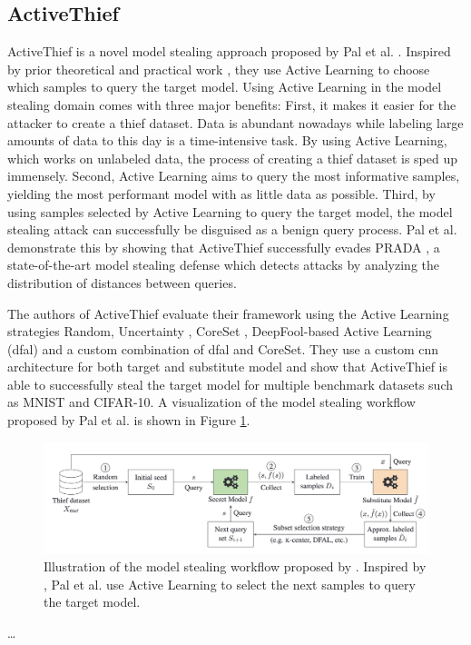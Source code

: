 \subsection{ActiveThief}
\label{sec:Related_work:Model_Stealing:ActiveThief}
ActiveThief is a novel model stealing approach proposed by Pal et al. \cite{pal2020activethief}. Inspired by prior theoretical \cite{chandrasekaran2020exploring}
and practical work \cite{shi2018active}, they use Active Learning to choose which samples to query the target model. Using Active Learning in the model stealing
domain comes with three major benefits: First, it makes it easier for the attacker to create a thief dataset. Data is abundant nowadays while labeling large amounts
of data to this day is a time-intensive task. By using Active Learning, which works on unlabeled data, the process of creating a thief dataset is sped up immensely.
Second, Active Learning aims to query the most informative samples, yielding the most performant model with as little data as possible. Third, by using samples selected
by Active Learning to query the target model, the model stealing attack can successfully be disguised as a benign query process. Pal et al. demonstrate this by showing 
that ActiveThief successfully evades PRADA \cite{juuti2019prada}, a state-of-the-art model stealing defense which detects attacks by analyzing the distribution of distances
between queries. \par
The authors of ActiveThief evaluate their framework using the Active Learning strategies Random, Uncertainty \cite{lewis1995sequential}, CoreSet \cite{sener2017active},
DeepFool-based Active Learning (\gls{dfal}) \cite{ducoffe2018adversarial} and a custom combination of \gls{dfal} and CoreSet. They use a custom \gls{cnn} architecture
for both target and substitute model and show that ActiveThief is able to successfully steal the target model for multiple benchmark datasets such as MNIST and CIFAR-10.
A visualization of the model stealing workflow proposed by Pal et al. is shown in Figure \ref{fig:ActiveThief}.

\begin{figure} [ht]
    \centering
    \includegraphics[width=.9\linewidth]{images/ActiveThief_Idea.png}
    \caption[Visualization of ActiveThief]{Illustration of the model stealing workflow proposed by \cite{pal2020activethief}. Inspired by
    \cite{chandrasekaran2020exploring}, Pal et al. use Active Learning to select the next samples to query the target model.}
    \label{fig:ActiveThief}
\end{figure}

\dots
